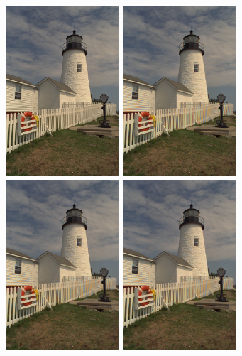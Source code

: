 \documentclass[a4paper]{article}
\begin{document}
\begin{figure}[h!]
\centering
\includegraphics[width=120pt]{img/img8.png}
\includegraphics[width=120pt]{img/img8-0.png}
\includegraphics[width=120pt]{img/img8-1.png}
\includegraphics[width=120pt]{img/img8-2.png}

\end{figure}
\end{document}
